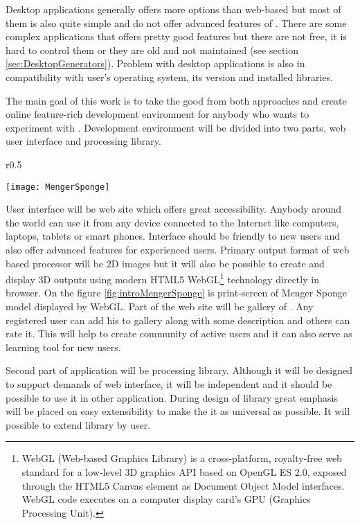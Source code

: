 Desktop applications generally offers more options than web-based but most of them is also quite simple and do not offer advanced features of \lsystems.
There are some complex applications that offers pretty good features but there are not free, it is hard to control them or they are old and not maintained (see section \ref{sec:DesktopGenerators}).
Problem with desktop applications is also in compatibility with user's operating system, its version and installed libraries.

The main goal of this work is to take the good from both approaches and create online feature-rich development environment for anybody who wants to experiment with \lsystems.
Development environment will be divided into two parts, web user interface and \lsystem processing library.

\begin{wrapfigure}{r}{0.5\textwidth}
	\begin{center}
		\texttt{[image: MengerSponge]}
	\end{center}
	\caption{Menger sponge created by \lsystem}
	\label{fig:introMengerSponge}
\end{wrapfigure}

User interface will be web site which offers great accessibility.
Anybody around the world can use it from any device connected to the Internet like computers, laptops, tablets or smart phones.
Interface should be friendly to new users and also offer advanced features for experienced users.
Primary output format of web based \lsystem processor will be 2D images but it will also be possible to create and display 3D outputs using modern HTML5 WebGL\footnote{
	WebGL (Web-based Graphics Library) is a cross-platform, royalty-free web standard for a low-level 3D graphics API based on OpenGL ES 2.0, exposed through the HTML5 Canvas element as Document Object Model interfaces.
	WebGL code executes on a computer display card's GPU (Graphics Processing Unit).} technology directly in browser.
On the figure \ref{fig:introMengerSponge} is print-screen of Menger Sponge model displayed by WebGL.
Part of the web site will be gallery of \lsystems.
Any registered user can add his \lsystems to gallery along with some description and others can rate it.
This will help to create community of active users and it can also serve as learning tool for new users.

Second part of application will be \lsystem processing library.
Although it will be designed to support demands of web interface, it will be independent and it should be possible to use it in other application.
During design of library great emphasis will be placed on easy extensibility to make the it as universal as possible.
It will possible to extend library by user.

